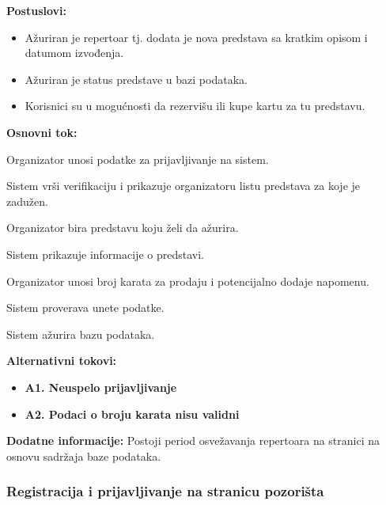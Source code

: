 \documentclass[a4paper]{article}
\begin{document}
\noindent\textbf{Postuslovi:} 
  \begin{itemize}
    \item Ažuriran je repertoar tj. dodata je nova predstava sa kratkim opisom i datumom izvođenja.
    \item Ažuriran je status predstave u bazi podataka.
    \item Korisnici su u mogućnosti da rezervišu ili kupe kartu za tu predstavu.
  \end{itemize}

\noindent\textbf{Osnovni tok:}
  \begin{legal}
    \item Organizator unosi podatke za prijavljivanje na sistem.
    \item Sistem vrši verifikaciju i prikazuje organizatoru listu predstava za koje je zadužen.
    \item Organizator bira predstavu koju želi da ažurira.
    \item Sistem prikazuje informacije o predstavi.
    \item Organizator unosi broj karata za prodaju i potencijalno dodaje napomenu.
    \item Sistem proverava unete podatke.
    \item Sistem ažurira bazu podataka.
  \end{legal}

\noindent\textbf{Alternativni tokovi:} 
\begin{itemize}
  \item \textbf{A1. Neuspelo prijavljivanje} 
  \item \textbf{A2. Podaci o broju karata nisu validni} 
\end{itemize}

\noindent\textbf{Dodatne informacije:} Postoji period osvežavanja repertoara na stranici na osnovu
  sadržaja baze podataka.

\subsubsection{Registracija i prijavljivanje na stranicu pozorišta}
\end{document}
